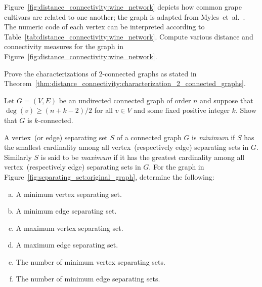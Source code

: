 \begin{problem}
\item Figure~\ref{fig:distance_connectivity:wine_network} depicts how
  common grape cultivars are related to one another; the
  graph is adapted from Myles~et~al.~\cite{MylesEtAl2010}. The numeric
  code of each vertex can be interpreted according to
  Table~\ref{tab:distance_connectivity:wine_network}. Compute various
  distance and connectivity measures for the graph in
  Figure~\ref{fig:distance_connectivity:wine_network}.

\item Prove the characterizations of $2$-connected graphs as stated in
  Theorem~\ref{thm:distance_connectivity:characterization_2_connected_graphs}.

\item Let $G = (V,E)$ be an undirected connected graph of order $n$
  and suppose that $\deg(v) \geq (n + k - 2) / 2$ for all $v \in V$
  and some fixed positive integer $k$. Show that $G$ is
  $k$-connected.

\item A vertex~(or edge) separating set $S$ of a connected graph $G$
  is \emph{minimum} if $S$ has the smallest cardinality among all
  vertex~(respectively edge) separating sets in $G$. Similarly $S$ is
  said to be \emph{maximum} if it has the greatest cardinality among
  all vertex~(respectively edge) separating sets in $G$. For the graph
  in Figure~\ref{fig:separating_set:original_graph}, determine the
  following:
  \begin{enumerate}[(a)]
  \item A minimum vertex separating set.

  \item A minimum edge separating set.

  \item A maximum vertex separating set.

  \item A maximum edge separating set.

  \item The number of minimum vertex separating sets.

  \item The number of minimum edge separating sets.
  \end{enumerate}
\end{problem}
